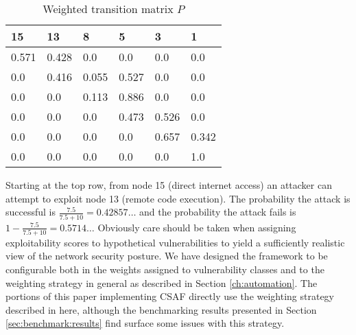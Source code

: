 \begin{table}[H]
\caption{Weighted transition matrix $P$}
\centering
\begin{tabular}{@{}llllll@{}}
\toprule
15 & 13 & 8 & 5 & 3 & 1 \\ \midrule
0.571 & 0.428 & 0.0 & 0.0 & 0.0 & 0.0 \\
0.0 & 0.416 & 0.055 & 0.527 & 0.0 & 0.0 \\
0.0 & 0.0 & 0.113 & 0.886 & 0.0 & 0.0 \\
0.0 & 0.0 & 0.0 & 0.473 & 0.526 & 0.0 \\
0.0 & 0.0 & 0.0 & 0.0 & 0.657 & 0.342 \\
0.0 & 0.0 & 0.0 & 0.0 & 0.0 & 1.0 \\ \bottomrule            
\end{tabular}
\label{fig:eg_transmatrix}
\end{table}

Starting at the top row, from node 15 (direct internet access) an attacker can attempt to exploit node 13 (remote code execution). The probability the attack is successful is $\frac{7.5}{7.5 + 10}=0.42857\dots$ and the probability the attack fails is $1 - \frac{7.5}{7.5 + 10} = 0.5714\dots$ Obviously care should be taken when assigning exploitability scores to hypothetical vulnerabilities to yield a sufficiently realistic view of the network security posture. We have designed the framework to be configurable both in the weights assigned to vulnerability classes and to the weighting strategy in general as described in Section \ref{ch:automation}. The portions of this paper implementing CSAF directly use the weighting strategy described in here, although the benchmarking results presented in Section \ref{sec:benchmark:results} find surface some issues with this strategy. 

% 
